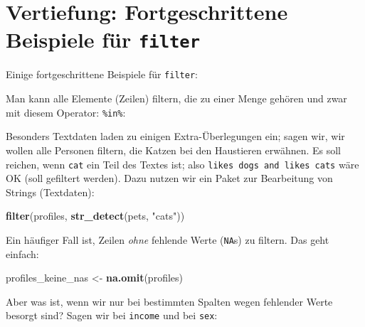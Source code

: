 \documentclass[12pt,ngerman,paper=a4,pagesize,DIV=13]{scrreprt}
\newenvironment{Shaded}{\begin{snugshade}}{\end{snugshade}}
\newcommand{\KeywordTok}[1]{\textcolor[rgb]{0.13,0.29,0.53}{\textbf{#1}}}
\newcommand{\NormalTok}[1]{#1}
\newcommand{\OperatorTok}[1]{\textcolor[rgb]{0.81,0.36,0.00}{\textbf{#1}}}
\newcommand{\StringTok}[1]{\textcolor[rgb]{0.31,0.60,0.02}{#1}}
\begin{document}
\hypertarget{vertiefung-fortgeschrittene-beispiele-fur-filter}{%
\section{\texorpdfstring{Vertiefung: Fortgeschrittene Beispiele für
\texttt{filter}}{Vertiefung: Fortgeschrittene Beispiele für filter}}\label{vertiefung-fortgeschrittene-beispiele-fur-filter}}

Einige fortgeschrittene Beispiele für \texttt{filter}:

Man kann alle Elemente (Zeilen) filtern, die zu einer Menge gehören und
zwar mit diesem Operator: \texttt{\%in\%}:

\begin{Shaded}
\end{Shaded}

Besonders Textdaten laden zu einigen Extra-Überlegungen ein; sagen wir,
wir wollen alle Personen filtern, die Katzen bei den Haustieren
erwähnen. Es soll reichen, wenn \texttt{cat} ein Teil des Textes ist;
also \texttt{likes\ dogs\ and\ likes\ cats} wäre OK (soll gefiltert
werden). Dazu nutzen wir ein Paket zur Bearbeitung von Strings
(Textdaten):

\begin{Shaded}
\begin{Highlighting}[]
\KeywordTok{filter}\NormalTok{(profiles, }\KeywordTok{str_detect}\NormalTok{(pets, }\StringTok{"cats"}\NormalTok{))}
\end{Highlighting}
\end{Shaded}

Ein häufiger Fall ist, Zeilen \emph{ohne} fehlende Werte (\texttt{NA}s)
zu filtern. Das geht einfach:

\begin{Shaded}
\begin{Highlighting}[]
\NormalTok{profiles_keine_nas <-}\StringTok{ }\KeywordTok{na.omit}\NormalTok{(profiles)}
\end{Highlighting}
\end{Shaded}

Aber was ist, wenn wir nur bei bestimmten Spalten wegen fehlender Werte
besorgt sind? Sagen wir bei \texttt{income} und bei \texttt{sex}:
\end{document}
